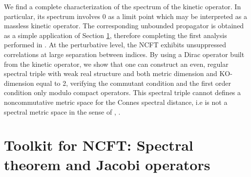 \documentclass[a4paper]{jpconf}
\numberwithin{equation}{section}
\theoremstyle{nonumberplain}
\begin{document}
We find a complete characterization of the spectrum of the kinetic operator. In particular, its spectrum involves $0$ as a limit point which may be interpreted as a massless kinetic operator. The corresponding unbounded propagator is obtained as a simple application of Section \ref{subsection21}, therefore completing the first analysis performed in \cite{MVW13}.  At the perturbative level, the NCFT exhibits unsuppressed correlations at large separation between indices. By using a Dirac operator built from the kinetic operator, we show that one can construct an even, regular spectral triple with weak real structure and both metric dimension and KO-dimension equal to 2, verifying the commutant condition and the first order condition only modulo compact operators. This spectral triple cannot defines a noncommutative metric space for the Connes spectral distance, i.e is not a spectral metric space in the sense of \cite{homot-moyal}, \cite{bel-mar}.


\section{Toolkit for NCFT: Spectral theorem and Jacobi operators}\label{subsection21}
\end{document}
